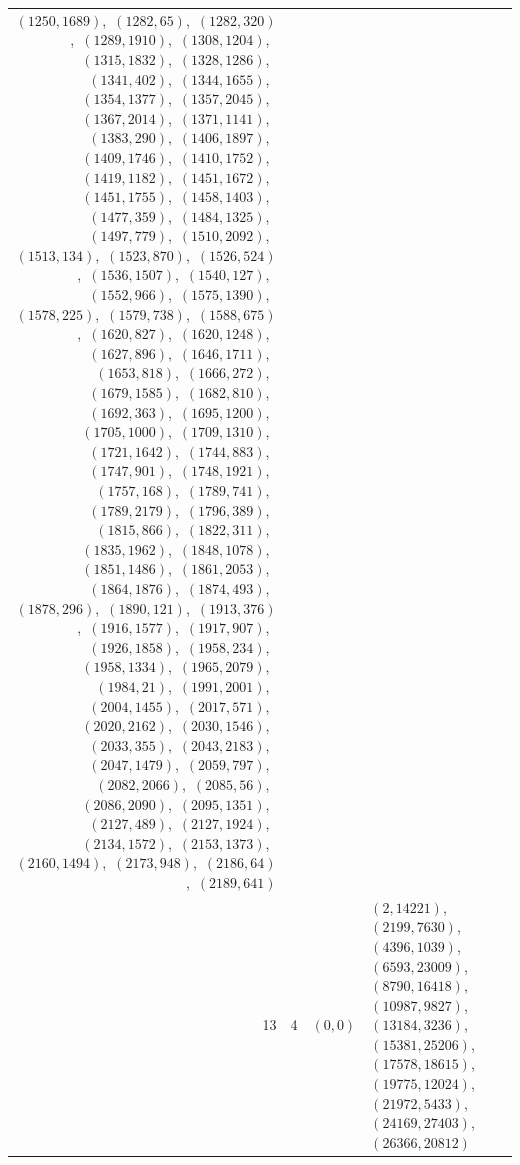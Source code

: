 \documentclass[11pt]{article}
\begin{document}
\begin{longtable}{@{}rrl>{\raggedright\arraybackslash}p{}@{}}
$(1250,1689)$,\allowbreak\ $(1282,65)$,\allowbreak\ $(1282,320)$,\allowbreak\ $(1289,1910)$,\allowbreak\ $(1308,1204)$,\allowbreak\ $(1315,1832)$,\allowbreak\ $(1328,1286)$,\allowbreak\ $(1341,402)$,\allowbreak\ $(1344,1655)$,\allowbreak\ $(1354,1377)$,\allowbreak\ $(1357,2045)$,\allowbreak\ $(1367,2014)$,\allowbreak\ $(1371,1141)$,\allowbreak\ $(1383,290)$,\allowbreak\ $(1406,1897)$,\allowbreak\ $(1409,1746)$,\allowbreak\ $(1410,1752)$,\allowbreak\ $(1419,1182)$,\allowbreak\ $(1451,1672)$,\allowbreak\ $(1451,1755)$,\allowbreak\ $(1458,1403)$,\allowbreak\ $(1477,359)$,\allowbreak\ $(1484,1325)$,\allowbreak\ $(1497,779)$,\allowbreak\ $(1510,2092)$,\allowbreak\ $(1513,134)$,\allowbreak\ $(1523,870)$,\allowbreak\ $(1526,524)$,\allowbreak\ $(1536,1507)$,\allowbreak\ $(1540,127)$,\allowbreak\ $(1552,966)$,\allowbreak\ $(1575,1390)$,\allowbreak\ $(1578,225)$,\allowbreak\ $(1579,738)$,\allowbreak\ $(1588,675)$,\allowbreak\ $(1620,827)$,\allowbreak\ $(1620,1248)$,\allowbreak\ $(1627,896)$,\allowbreak\ $(1646,1711)$,\allowbreak\ $(1653,818)$,\allowbreak\ $(1666,272)$,\allowbreak\ $(1679,1585)$,\allowbreak\ $(1682,810)$,\allowbreak\ $(1692,363)$,\allowbreak\ $(1695,1200)$,\allowbreak\ $(1705,1000)$,\allowbreak\ $(1709,1310)$,\allowbreak\ $(1721,1642)$,\allowbreak\ $(1744,883)$,\allowbreak\ $(1747,901)$,\allowbreak\ $(1748,1921)$,\allowbreak\ $(1757,168)$,\allowbreak\ $(1789,741)$,\allowbreak\ $(1789,2179)$,\allowbreak\ $(1796,389)$,\allowbreak\ $(1815,866)$,\allowbreak\ $(1822,311)$,\allowbreak\ $(1835,1962)$,\allowbreak\ $(1848,1078)$,\allowbreak\ $(1851,1486)$,\allowbreak\ $(1861,2053)$,\allowbreak\ $(1864,1876)$,\allowbreak\ $(1874,493)$,\allowbreak\ $(1878,296)$,\allowbreak\ $(1890,121)$,\allowbreak\ $(1913,376)$,\allowbreak\ $(1916,1577)$,\allowbreak\ $(1917,907)$,\allowbreak\ $(1926,1858)$,\allowbreak\ $(1958,234)$,\allowbreak\ $(1958,1334)$,\allowbreak\ $(1965,2079)$,\allowbreak\ $(1984,21)$,\allowbreak\ $(1991,2001)$,\allowbreak\ $(2004,1455)$,\allowbreak\ $(2017,571)$,\allowbreak\ $(2020,2162)$,\allowbreak\ $(2030,1546)$,\allowbreak\ $(2033,355)$,\allowbreak\ $(2043,2183)$,\allowbreak\ $(2047,1479)$,\allowbreak\ $(2059,797)$,\allowbreak\ $(2082,2066)$,\allowbreak\ $(2085,56)$,\allowbreak\ $(2086,2090)$,\allowbreak\ $(2095,1351)$,\allowbreak\ $(2127,489)$,\allowbreak\ $(2127,1924)$,\allowbreak\ $(2134,1572)$,\allowbreak\ $(2153,1373)$,\allowbreak\ $(2160,1494)$,\allowbreak\ $(2173,948)$,\allowbreak\ $(2186,64)$,\allowbreak\ $(2189,641)$\\
13 & 4 & $(0,0)$ & $(2,14221)$,\allowbreak\ $(2199,7630)$,\allowbreak\ $(4396,1039)$,\allowbreak\ $(6593,23009)$,\allowbreak\ $(8790,16418)$,\allowbreak\ $(10987,9827)$,\allowbreak\ $(13184,3236)$,\allowbreak\ $(15381,25206)$,\allowbreak\ $(17578,18615)$,\allowbreak\ $(19775,12024)$,\allowbreak\ $(21972,5433)$,\allowbreak\ $(24169,27403)$,\allowbreak\ $(26366,20812)$\\

\end{longtable}
\end{document}
